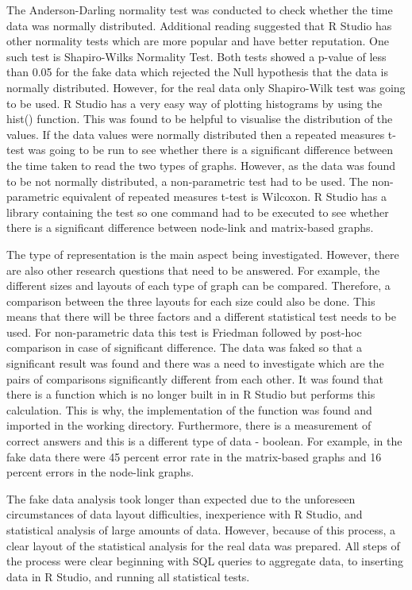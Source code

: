 \documentclass{l4proj}
\begin{document}
The Anderson-Darling normality test was conducted to check whether the time data was normally distributed. Additional reading suggested that R Studio has other normality tests which are more popular and have better reputation. One such test is Shapiro-Wilks Normality Test. Both tests showed a p-value of less than 0.05 for the fake data which rejected the Null hypothesis that the data is normally distributed. However, for the real data only Shapiro-Wilk test was going to be used. R Studio has a very easy way of plotting histograms by using the hist() function. This was found to be helpful to visualise the distribution of the values. If the data values were normally distributed then a repeated measures t-test was going to be run to see whether there is a significant difference between the time taken to read the two types of graphs. However, as the data was found to be not normally distributed, a non-parametric test had to be used. The non-parametric equivalent of repeated measures t-test is Wilcoxon. R Studio has a library containing the test so one command had to be executed to see whether there is a significant difference between node-link and matrix-based graphs. 

The type of representation is the main aspect being investigated. However, there are also other research questions that need to be answered. For example, the different sizes and layouts of each type of graph can be compared. Therefore, a comparison between the three layouts for each size could also be done. This means that there will be three factors and a different statistical test needs to be used. For non-parametric data this test is Friedman followed by post-hoc comparison in case of significant difference. The data was faked so that a significant result was found and there was a need to investigate which are the pairs of comparisons significantly different from each other. It was found that there is a function which is no longer built in in R Studio but performs this calculation. This is why, the implementation of the function was found and imported in the working directory. Furthermore, there is a measurement of correct answers and this is a different type of data - boolean. For example, in the fake data there were 45 percent error rate in the matrix-based graphs and 16 percent errors in the node-link graphs. 

The fake data analysis took longer than expected due to the unforeseen circumstances of data layout difficulties, inexperience with R Studio, and statistical analysis of large amounts of data. However, because of this process, a clear layout of the statistical analysis for the real data was prepared. All steps of the process were clear beginning with SQL queries to aggregate data, to inserting data in R Studio, and running all statistical tests.
\end{document}
